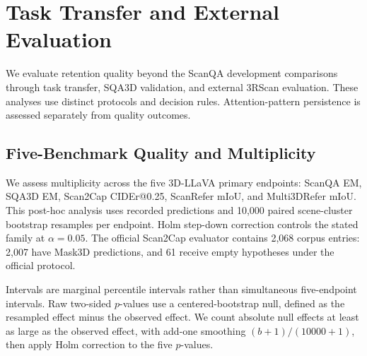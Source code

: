 \section{Task Transfer and External Evaluation}
\label{sec:supp_transfer}
We evaluate retention quality beyond the ScanQA development comparisons through task transfer, SQA3D validation, and external 3RScan evaluation. These analyses use distinct protocols and decision rules. Attention-pattern persistence is assessed separately from quality outcomes.


\subsection{Five-Benchmark Quality and Multiplicity}
\label{sec:supp_multiplicity}

We assess multiplicity across the five 3D-LLaVA primary endpoints: ScanQA EM, SQA3D EM, Scan2Cap CIDEr@0.25, ScanRefer mIoU, and Multi3DRefer mIoU. This post-hoc analysis uses recorded predictions and 10,000 paired scene-cluster bootstrap resamples per endpoint. Holm step-down correction controls the stated family at $\alpha=0.05$. The official Scan2Cap evaluator contains 2,068 corpus entries: 2,007 have Mask3D predictions, and 61 receive empty hypotheses under the official protocol.

Intervals are marginal percentile intervals rather than simultaneous five-endpoint intervals. Raw two-sided $p$-values use a centered-bootstrap null, defined as the resampled effect minus the observed effect. We count absolute null effects at least as large as the observed effect, with add-one smoothing $(b+1)/(10000+1)$, then apply Holm correction to the five $p$-values.

\begin{table}[t]
\centering
\caption{Family-wise sensitivity across the five 3D-LLaVA primary endpoints. Deltas are GeoGate minus baseline: EM in percentage points, mIoU in 0--100-scale points, and CIDEr in score points. Intervals are marginal paired scene-cluster percentile 95\% intervals; Holm $p$-values address the five-endpoint family.}
\label{tab:supp_multiplicity}
\end{table}

